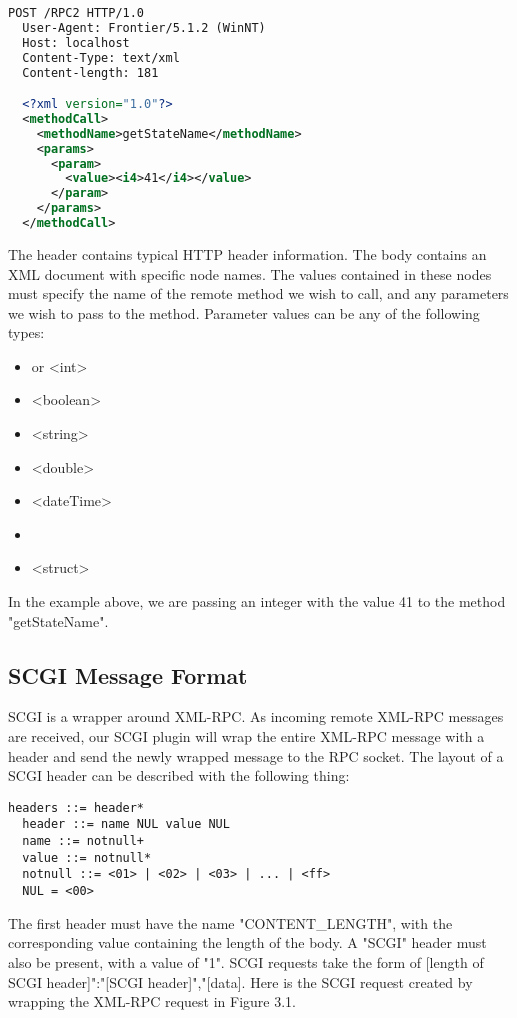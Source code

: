 \vspace{20px}
\begin{lstlisting}[caption=A basic XML-RPC request, language=XML]
  POST /RPC2 HTTP/1.0
  User-Agent: Frontier/5.1.2 (WinNT)
  Host: localhost
  Content-Type: text/xml
  Content-length: 181

  <?xml version="1.0"?>
  <methodCall>
    <methodName>getStateName</methodName>
    <params>
      <param>
        <value><i4>41</i4></value>
      </param>
    </params>
  </methodCall>
\end{lstlisting}

The header contains typical HTTP header information. The body contains an XML document with specific node names. The values contained in these nodes must specify the name of the remote method we wish to call, and any parameters we wish to pass to the method. Parameter values can be any of the following types:

\begin{itemize}
	\item <i4> or <int>
	\item <boolean>
	\item <string>
	\item <double>
	\item <dateTime>
	\item <base64>
	\item <struct>
\end{itemize}

In the example above, we are passing an integer with the value 41 to the method "getStateName".

\subsection{SCGI Message Format}
SCGI is a wrapper around XML-RPC. As incoming remote XML-RPC messages are received, our SCGI plugin will wrap the entire XML-RPC message with a header and send the newly wrapped message to the RPC socket. The layout of a SCGI header can be described with the following thing:

\vspace{20px}
\begin{lstlisting}[caption=Layout of a SCGI header]
  headers ::= header*
  header ::= name NUL value NUL
  name ::= notnull+                
  value ::= notnull*
  notnull ::= <01> | <02> | <03> | ... | <ff>
  NUL = <00>
\end{lstlisting}

The first header must have the name "CONTENT\_LENGTH", with the corresponding value containing the length of the body. A "SCGI" header must also be present, with a value of "1". SCGI requests take the form of [length of SCGI header]":"[SCGI header]","[data]. Here is the SCGI request created by wrapping the XML-RPC request in Figure 3.1. 


